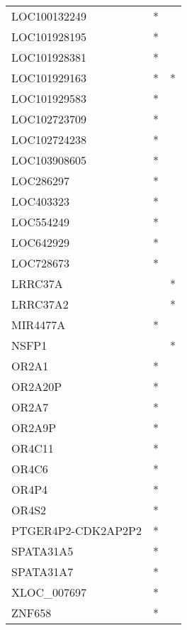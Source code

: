 \begin{longtable}{lcc}
LOC100132249       &  * &         \\
LOC101928195       &  * &         \\
LOC101928381       &  * &         \\
LOC101929163       &  * &       * \\
LOC101929583       &  * &         \\
LOC102723709       &  * &         \\
LOC102724238       &  * &         \\
LOC103908605       &  * &         \\
LOC286297          &  * &         \\
LOC403323          &  * &         \\
LOC554249          &  * &         \\
LOC642929          &  * &         \\
LOC728673          &  * &         \\
LRRC37A            &    &       * \\
LRRC37A2           &    &       * \\
MIR4477A           &  * &         \\
NSFP1              &    &       * \\
OR2A1              &  * &         \\
OR2A20P            &  * &         \\
OR2A7              &  * &         \\
OR2A9P             &  * &         \\
OR4C11             &  * &         \\
OR4C6              &  * &         \\
OR4P4              &  * &         \\
OR4S2              &  * &         \\
PTGER4P2-CDK2AP2P2 &  * &         \\
SPATA31A5          &  * &         \\
SPATA31A7          &  * &         \\
XLOC\_007697        &  * &         \\
ZNF658             &  * &         \\
\end{longtable}
